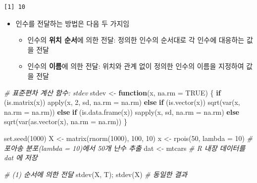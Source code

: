 \documentclass[
  11pt,
]{krantz}
\newenvironment{Shaded}{\begin{snugshade}}{\end{snugshade}}
\newcommand{\AttributeTok}[1]{\textcolor[rgb]{0.61,0.61,0.61}{#1}}
\newcommand{\CommentTok}[1]{\textcolor[rgb]{0.37,0.37,0.37}{\textit{#1}}}
\newcommand{\ConstantTok}[1]{\textcolor[rgb]{0,0,0}{#1}}
\newcommand{\ControlFlowTok}[1]{\textcolor[rgb]{0.27,0.27,0.27}{\textbf{#1}}}
\newcommand{\DecValTok}[1]{\textcolor[rgb]{0.06,0.06,0.06}{#1}}
\newcommand{\FunctionTok}[1]{\textcolor[rgb]{0,0,0}{#1}}
\newcommand{\NormalTok}[1]{#1}
\newcommand{\OtherTok}[1]{\textcolor[rgb]{0.37,0.37,0.37}{#1}}
\providecommand{\tightlist}{%
  \setlength{\itemsep}{0pt}\setlength{\parskip}{0pt}}
\begin{document}
\begin{verbatim}
[1] 10
\end{verbatim}

\normalsize

\begin{itemize}
\tightlist
\item
  인수를 전달하는 방법은 다음 두 가지임

  \begin{itemize}
  \tightlist
  \item
    인수의 \textbf{위치 순서}에 의한 전달: 정의한 인수의 순서대로 각 인수에 대응하는 값을 전달
  \item
    인수의 \textbf{이름}에 의한 전달: 위치와 관계 없이 정의한 인수의 이름을 지정하여 값을 전달
  \end{itemize}
\end{itemize}

\footnotesize

\begin{Shaded}
\begin{Highlighting}[]
\CommentTok{\# 표준편차 계산 함수: stdev}
\NormalTok{stdev }\OtherTok{\textless{}{-}} \ControlFlowTok{function}\NormalTok{(x, }\AttributeTok{na.rm =} \ConstantTok{TRUE}\NormalTok{) \{}
  \ControlFlowTok{if}\NormalTok{ (}\FunctionTok{is.matrix}\NormalTok{(x)) }\FunctionTok{apply}\NormalTok{(x, }\DecValTok{2}\NormalTok{, sd, }\AttributeTok{na.rm =}\NormalTok{ na.rm)}
  \ControlFlowTok{else} \ControlFlowTok{if}\NormalTok{ (}\FunctionTok{is.vector}\NormalTok{(x)) }\FunctionTok{sqrt}\NormalTok{(}\FunctionTok{var}\NormalTok{(x, }\AttributeTok{na.rm =}\NormalTok{ na.rm))}
  \ControlFlowTok{else} \ControlFlowTok{if}\NormalTok{ (}\FunctionTok{is.data.frame}\NormalTok{(x)) }\FunctionTok{sapply}\NormalTok{(x, sd, }\AttributeTok{na.rm =}\NormalTok{ na.rm)}
  \ControlFlowTok{else} \FunctionTok{sqrt}\NormalTok{(}\FunctionTok{var}\NormalTok{(}\FunctionTok{as.vector}\NormalTok{(x), }\AttributeTok{na.rm =}\NormalTok{ na.rm))}
\NormalTok{\}}

\FunctionTok{set.seed}\NormalTok{(}\DecValTok{1000}\NormalTok{)}
\NormalTok{X }\OtherTok{\textless{}{-}} \FunctionTok{matrix}\NormalTok{(}\FunctionTok{rnorm}\NormalTok{(}\DecValTok{1000}\NormalTok{), }\DecValTok{100}\NormalTok{, }\DecValTok{10}\NormalTok{)}
\NormalTok{x }\OtherTok{\textless{}{-}} \FunctionTok{rpois}\NormalTok{(}\DecValTok{50}\NormalTok{, }\AttributeTok{lambda =} \DecValTok{10}\NormalTok{) }\CommentTok{\# 포아송 분포(lambda = 10)에서 50개 난수 추출}
\NormalTok{dat }\OtherTok{\textless{}{-}}\NormalTok{ mtcars }\CommentTok{\# R 내장 데이터를 dat 에 저장}

\CommentTok{\# (1) 순서에 의한 전달}
\FunctionTok{stdev}\NormalTok{(X, T); }\FunctionTok{stdev}\NormalTok{(X) }\CommentTok{\# 동일한 결과}
\end{Highlighting}
\end{Shaded}
\end{document}
